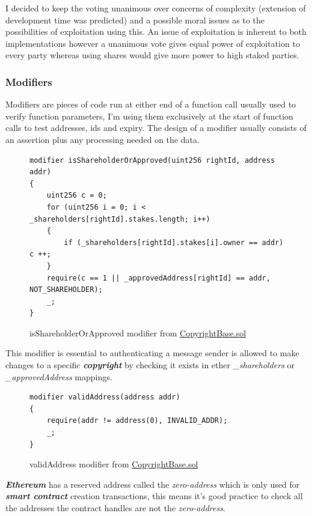 \documentclass[12pt]{article}
\newcommand{\keyword}[1]{\textbf{\textit{#1}}}
\begin{document}
I decided to keep the voting unanimous over concerns of complexity (extension of development time was predicted) and a possible moral issues as to the possibilities of exploitation using this. An issue of exploitation is inherent to both implementations however a unanimous vote gives equal power of exploitation to every party whereas using shares would give more power to high staked parties.
 

\subsubsection{Modifiers}

Modifiers are pieces of code run at either end of a function call usually used to verify function parameters, I'm using them exclusively at the start of function calls to test addresses, ids and expiry. The design of a modifier usually consists of an assertion plus any processing needed on the data. 

\begin{figure}[H]
\caption{isShareholderOrApproved modifier from \href{https://github.com/MrHarrisonBarker/CRPL/blob/main/CRPL.Contracts/contracts/Copyrights/CopyrightBase.sol}{CopyrightBase.sol}}
\centering
\begin{lstlisting}[language=Solidity]
modifier isShareholderOrApproved(uint256 rightId, address addr) 
{
	uint256 c = 0;
	for (uint256 i = 0; i < _shareholders[rightId].stakes.length; i++) 
	{
		if (_shareholders[rightId].stakes[i].owner == addr) c ++;
	}
	require(c == 1 || _approvedAddress[rightId] == addr, NOT_SHAREHOLDER);
	_;
}
\end{lstlisting}
\end{figure}

This modifier is essential to authenticating a message sender is allowed to make changes to a specific \keyword{copyright} by checking it exists in ether \textit{\_shareholders} or \textit{\_approvedAddress} mappings.

\begin{figure}[H]
\caption{validAddress modifier from \href{https://github.com/MrHarrisonBarker/CRPL/blob/main/CRPL.Contracts/contracts/Copyrights/CopyrightBase.sol}{CopyrightBase.sol}}
\centering
\begin{lstlisting}[language=Solidity]
modifier validAddress(address addr)
{
	require(addr != address(0), INVALID_ADDR);
	_;
}
\end{lstlisting}
\end{figure}

\keyword{Ethereum} has a reserved address called the \textit{zero-address} which is only used for \keyword{smart contract} creation transactions, this means it's good practice to check all the addresses the contract handles are not the \textit{zero-address}. 
\end{document}
